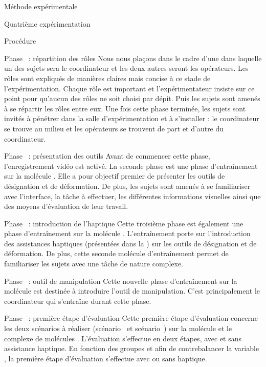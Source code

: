 \documentclass[myfrancais,ngerman,english,frenchb]{mythesis}
\begin{document}
\begin{mychapter}{Méthode expérimentale}
\begin{mysection}{Quatrième expérimentation}
\begin{mysubsection}{Procédure}
\begin{myparagraph}{Phase~ : répartition des rôles}
					Nous nous plaçons dans le cadre d'une  dans laquelle un des sujets sera le coordinateur et les deux autres seront les opérateurs.
					Les rôles sont expliqués de manières claires mais concise à ce stade de l'expérimentation.
					Chaque rôle est important et l'expérimentateur insiste sur ce point pour qu'aucun des rôles ne soit choisi par dépit.
					Puis les sujets sont amenés à se répartir les rôles entre eux.
					Une fois cette phase terminée, les sujets sont invités à pénétrer dans la salle d'expérimentation et à s'installer : le coordinateur se trouve au milieu et les opérateurs se trouvent de part et d'autre du coordinateur.
				\end{myparagraph}
				\begin{myparagraph}{Phase~ : présentation des outils}
					Avant de commencer cette phase, l'enregistrement vidéo est activé.
					La seconde phase est une phase d'entraînement sur la molécule \myTRPCAGE.
					Elle a pour objectif premier de présenter les outils de désignation et de déformation.
					De plus, les sujets sont amenés à se familiariser avec l'interface, la tâche à effectuer, les différentes informations visuelles ainsi que des moyens d'évaluation de leur travail.
				\end{myparagraph}
				\begin{myparagraph}{Phase~ : introduction de l'haptique}
					Cette troisième phase est également une phase d'entraînement sur la molécule \myPrion.
					L'entraînement porte sur l'introduction des assistances haptiques (présentées dans la ) sur les outils de désignation et de déformation.
					De plus, cette seconde molécule d'entraînement permet de familiariser les sujets avec une tâche de nature complexe.
				\end{myparagraph}
				\begin{myparagraph}{Phase~ : outil de manipulation}
					Cette nouvelle phase d'entraînement sur la molécule \myTRPZIPPER est destinée à introduire l'outil de manipulation.
					C'est principalement le coordinateur qui s'entraîne durant cette phase.
				\end{myparagraph}
				\begin{myparagraph}{Phase~ : première étape d'évaluation}
					Cette première étape d'évaluation concerne les deux scénarios à réaliser (scénario~ et scénario~) sur la molécule \myUbiquitin et le complexe de molécules \myNusENusG.
					L'évaluation s'effectue en deux étapes, avec et sans assistance haptique.
					En fonction des groupes et afin de contrebalancer la variable , la première étape d'évaluation s'effectue avec ou sans haptique.


\end{myparagraph}
\end{mysubsection}
\end{mysection}
\end{mychapter}
\end{document}
